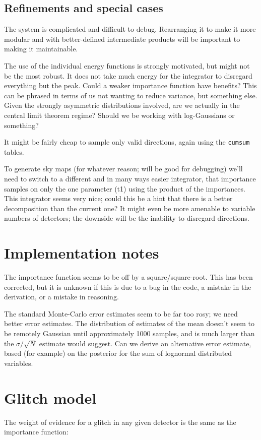 \documentclass{article}
\begin{document}
\subsection{Refinements and special cases}

The system is complicated and difficult to debug.  Rearranging it to make it more modular and with better-defined intermediate products will be important to making it maintainable.

The use of the individual energy functions is strongly motivated, but might not be the most robust.  It does not take much energy for the integrator to disregard everything but the peak.  Could a weaker importance function have benefits?  This can be phrased in terms of us not wanting to reduce variance, but something else.  Given the strongly asymmetric distributions involved, are we actually in the central limit theorem regime?  Should we be working with log-Gaussians or something?

It might be fairly cheap to sample only valid directions, again using the \texttt{cumsum} tables.

To generate sky maps (for whatever reason; will be good for debugging) we'll need to switch to a different and in many ways easier integrator, that importance samples on only the one parameter (t1) using the product of the importances.  This integrator seems very nice; could this be a hint that there is a better decomposition than the current one?  It might even be more amenable to variable numbers of detectors; the downside will be the inability to disregard directions.

\section{Implementation notes}
The importance function seems to be off by a square/square-root.  This has been corrected, but it is unknown if this is due to a bug in the code, a mistake in the derivation, or a mistake in reasoning.

The standard Monte-Carlo error estimates seem to be far too rosy; we need better error estimates.  The distribution of estimates of the mean doesn't seem to be remotely Gaussian until approximately 1000 samples, and is much larger than the $\sigma/\sqrt{N}$ estimate would suggest.  Can we derive an alternative error estimate, based (for example) on the posterior for the sum of  lognormal distributed variables.

\section{Glitch model}
The weight of evidence for a glitch in any given detector is the same as the importance function:
\end{document}
